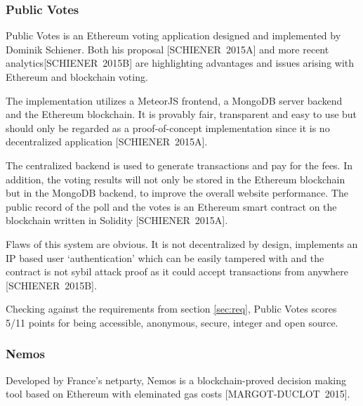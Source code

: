 \documentclass[9pt,oneside]{amsart}
\begin{document}
\begin{multicols}{2}
\subsubsection{Public Votes}
\label{sec:pubv}
Public Votes is an Ethereum voting application designed and implemented by Dominik Schiener. Both his proposal [SCHIENER~2015A] and more recent analytics[SCHIENER~2015B] are highlighting advantages and issues arising with Ethereum and blockchain voting.\par
The implementation utilizes a MeteorJS frontend, a MongoDB server backend and the Ethereum blockchain. It is provably fair, transparent and easy to use but should only be regarded as a proof-of-concept implementation since it is no decentralized application [SCHIENER~2015A].\par
The centralized backend is used to generate transactions and pay for the fees. In addition, the voting results will not only be stored in the Ethereum blockchain but in the MongoDB backend, to improve the overall website performance. The public record of the poll and the votes is an Ethereum smart contract on the blockchain written in Solidity [SCHIENER~2015A].\par
Flaws of this system are obvious. It is not decentralized by design, implements an IP based user \enquote*{authentication} which can be easily tampered with and the contract is not sybil attack proof as it could accept transactions from anywhere [SCHIENER~2015B].\par
Checking against the requirements from section \ref{sec:req}, Public Votes scores 5/11 points for being accessible, anonymous, secure, integer and open source.

\subsubsection{Nemos}
Developed by France's netparty, Nemos is a blockchain-proved decision making tool based on Ethereum with eleminated gas costs [MARGOT-DUCLOT~2015]. %


\end{multicols}
\end{document}
